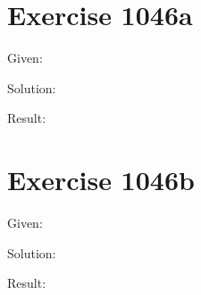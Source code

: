 \documentclass[a4paper, 10pt]{scrartcl}
\begin{document}
\section{Exercise 1046a}

Given:
\[
\]

Solution:

Result:

\section{Exercise 1046b}

Given:
\[
\]

Solution:

Result:
\end{document}
